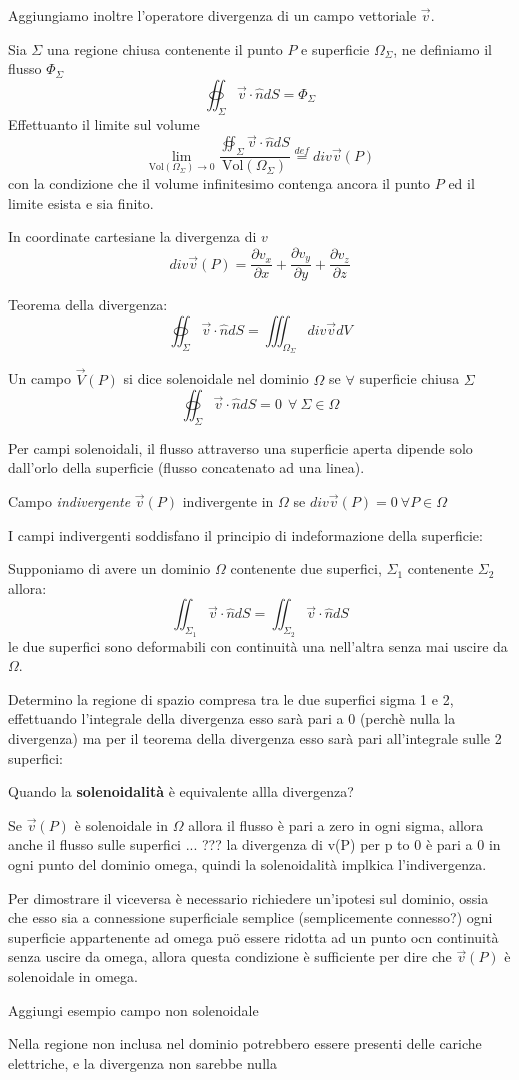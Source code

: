 Aggiungiamo inoltre l'operatore divergenza di un campo vettoriale $\vec{v}$.

Sia $\Sigma$ una regione chiusa contenente il punto $P$ e superficie $\Omega_\Sigma$, ne definiamo
il flusso $\Phi_\Sigma$
$$
\oiint_\Sigma \vec{v}\cdot \hat{n}dS = \Phi_\Sigma
$$
Effettuanto il limite sul volume 
$$
\lim_{\text{Vol}(\Omega_\Sigma)\to 0} \frac{\oiint_\Sigma \vec{v}\cdot \hat{n}dS}{\text{Vol}(\Omega_\Sigma)}
\stackrel{def}{=} div \vec{v}(P)
$$
con la condizione che il volume infinitesimo contenga ancora il punto $P$ ed il limite esista e 
sia finito.

In coordinate cartesiane la divergenza di $v$
$$
div\vec{v}(P) = \frac{\partial v_x}{\partial x} + \frac{\partial v_y}{\partial y} + \frac{\partial v_z}{\partial z}  
$$


Teorema della divergenza:
$$
\oiint_\Sigma \vec{v}\cdot \hat{n} dS = \iiint_{\Omega_\Sigma} div \vec{v} d V
$$


Un campo $\vec{V}(P)$ si dice solenoidale nel dominio $\Omega$ se $\forall$ superficie chiusa $\Sigma$
$$
\oiint_\Sigma \vec{v}\cdot \hat{n} dS = 0\ \ \forall\ \Sigma \in \Omega
$$

Per campi solenoidali, il flusso attraverso una superficie aperta dipende solo dall'orlo
della superficie (flusso concatenato ad una linea).

Campo \textit{indivergente} $\vec{v}(P)$ indivergente in $\Omega$ se $div \vec{v}(P) = 0 \ \forall P \in \Omega$

I campi indivergenti soddisfano il principio di indeformazione della superficie:

Supponiamo di avere un dominio $\Omega$ contenente due superfici, $\Sigma_1$ contenente $\Sigma_2$
allora:
$$
\iint_{\Sigma_1} \vec{v}\cdot\hat{n}dS = \iint_{\Sigma_2}\vec{v}\cdot\hat{n}dS 
$$
le due superfici sono deformabili con continuità una nell'altra senza mai uscire da $\Omega$.

Determino la regione di spazio compresa tra le due superfici sigma 1 e 2, effettuando l'integrale della
divergenza esso sarà pari a 0 (perchè nulla la divergenza) ma per il teorema della divergenza esso sarà 
pari all'integrale sulle 2 superfici:


Quando la \textbf{solenoidalità} è equivalente allla divergenza?

Se $\vec{v}(P)$ è solenoidale in $\Omega$ allora il flusso è pari a zero in ogni sigma, allora
anche il flusso sulle superfici ... ??? la divergenza di v(P) per p to 0 è pari a 0 in ogni punto
del dominio omega, quindi la solenoidalità implkica l'indivergenza.

Per dimostrare il viceversa è necessario richiedere un'ipotesi sul dominio, ossia che esso sia
a connessione superficiale semplice (semplicemente connesso?)
ogni superficie appartenente ad omega puö essere ridotta ad un punto ocn continuità senza uscire da omega,
allora questa condizione è sufficiente per dire che $\vec{v}(P)$ è solenoidale in omega.

Aggiungi esempio campo non solenoidale

Nella regione non inclusa nel dominio potrebbero essere presenti delle cariche elettriche, e la divergenza
non sarebbe nulla
